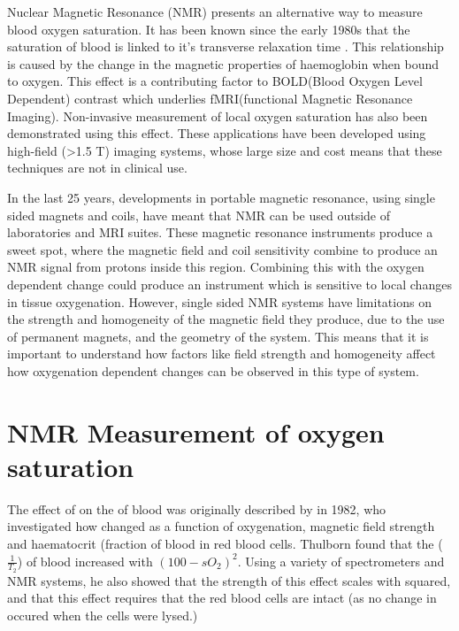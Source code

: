 Nuclear Magnetic Resonance (NMR) presents an alternative way to measure blood oxygen saturation.
It has been known since the early 1980s that the saturation of blood is linked to it's transverse relaxation time \Ttwo.
This relationship is caused by the change in the magnetic properties of haemoglobin when bound to oxygen.
This effect is a contributing factor to BOLD(Blood Oxygen Level Dependent) contrast which underlies fMRI(functional Magnetic Resonance Imaging).
Non-invasive measurement of local oxygen saturation has also been demonstrated using this effect.
These applications have been developed using high-field (>1.5 T) imaging systems, whose large size and cost means that these techniques are not in clinical use.

In the last 25 years, developments in portable magnetic resonance, using single sided magnets and coils, have meant that NMR can be used outside of laboratories and MRI suites.
These magnetic resonance instruments produce a sweet spot, where the magnetic field and coil sensitivity combine to produce an NMR signal from protons inside this region.
Combining this with the oxygen dependent \Ttwo change could produce an instrument which is sensitive to local changes in tissue oxygenation.
However, single sided NMR systems have limitations on the strength and homogeneity of the magnetic field they produce, due to the use of permanent magnets, and the geometry of the system.
This means that it is important to understand how factors like field strength and homogeneity affect how oxygenation dependent \Ttwo changes can be observed in this type of system.


\section{NMR Measurement of oxygen saturation}
The effect of \SOtwo on the \Ttwo of blood was originally described by \cite{ThulbornOxygenationdependencetransverse1982} in 1982, who investigated how \Ttwo changed as a function of oxygenation, magnetic field strength and haematocrit (fraction of blood in red blood cells.
Thulborn found that the \Rtwo ($\mathit{\frac{1}{T_2}}$) of blood increased with $(\mathit{100}-\mathit{sO_2})^2$.
Using a variety of spectrometers and NMR systems, he also showed that the strength of this effect scales with \Bzero squared, and that this effect requires that the red blood cells are intact (as no change in \Ttwo occured when the cells were lysed.)

